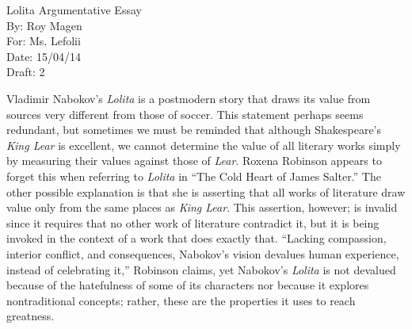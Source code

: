 \documentclass[12pt]{article}
\begin{document}
\begin{titlepage}
  \noindent Lolita Argumentative Essay \\
  By: Roy Magen \\
  For: Ms. Lefolii \\
  Date: 15/04/14 \\
  Draft: 2
\end{titlepage}
\noindent Vladimir Nabokov's \textit{Lolita} is a postmodern story that draws its value from sources very different from those of soccer. This statement perhaps seems redundant, but sometimes we must be reminded that although Shakespeare's \textit{King Lear} is excellent, we cannot determine the value of all literary works simply by measuring their values against those of \textit{Lear}. Roxena Robinson appears to forget this when referring to \textit{Lolita} in ``The Cold Heart of James Salter.'' The other possible explanation is that she is asserting that all works of literature draw value only from the same places as \textit{King Lear}. This assertion, however; is invalid since it requires that no other work of literature contradict it, but it is being invoked in the context of a work that does exactly that. ``Lacking compassion, interior conflict, and consequences, Nabokov's vision devalues human experience, instead of celebrating it,'' Robinson claims, yet Nabokov's \textit{Lolita} is not devalued because of the hatefulness of some of its characters nor because it explores nontraditional concepts; rather, these are the properties it uses to reach greatness.
\end{document}
